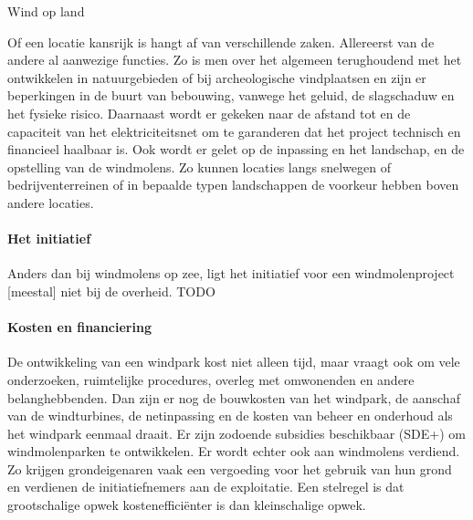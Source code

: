 \begin{voorstel}{Wind op land}
\begin{multicols}{2}
\begin{overwegingen}
Of een locatie kansrijk is hangt af van verschillende zaken. Allereerst van de andere al aanwezige functies. Zo is men over het algemeen terughoudend met het ontwikkelen in natuurgebieden of bij archeologische vindplaatsen en zijn er beperkingen in de buurt van bebouwing, vanwege het geluid, de slagschaduw en het fysieke risico. Daarnaast wordt er gekeken naar de afstand tot en de capaciteit van het elektriciteitsnet om te garanderen dat het project technisch en financieel haalbaar is. Ook wordt er gelet op de inpassing en het landschap, en de opstelling van de windmolens. Zo kunnen locaties langs snelwegen of bedrijventerreinen of in bepaalde typen landschappen de voorkeur hebben boven andere locaties.

\paragraph{Het initiatief}
Anders dan bij windmolens op zee, ligt het initiatief voor een windmolenproject [meestal] niet bij de overheid. TODO

\paragraph{Kosten en financiering}
De ontwikkeling van een windpark kost niet alleen tijd, maar vraagt ook om vele onderzoeken, ruimtelijke procedures, overleg met omwonenden en andere belanghebbenden. Dan zijn er nog de bouwkosten van het windpark, de aanschaf van de windturbines, de netinpassing en de kosten van beheer en onderhoud als het windpark eenmaal draait. Er zijn zodoende subsidies beschikbaar (SDE+) om windmolenparken te ontwikkelen. Er wordt echter ook aan windmolens verdiend. Zo krijgen grondeigenaren vaak een vergoeding voor het gebruik van hun grond en verdienen de initiatiefnemers aan de exploitatie. Een stelregel is dat grootschalige opwek kostenefficiënter is dan kleinschalige opwek.



\end{overwegingen}
\end{multicols}
\end{voorstel}
